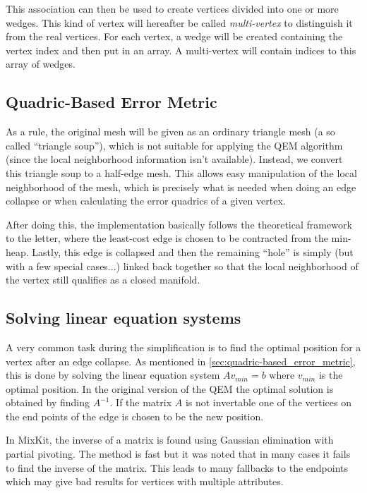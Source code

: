 This association can then be used to create vertices divided into one or more wedges. This kind of vertex will hereafter be called \emph{multi-vertex} to distinguish it from the real vertices. For each vertex, a wedge will be created containing the vertex index and then put in an array. A multi-vertex will contain indices to this array of wedges. 

\subsection{Quadric-Based Error Metric} \label{sec:quadric-based_error_metric2}
As a rule, the original mesh will be given as an ordinary triangle mesh (a so called ``triangle soup''), which is not suitable for applying the QEM algorithm (since the local neighborhood information isn't available). Instead, we convert this triangle soup to a half-edge mesh. This allows easy manipulation of the local neighborhood of the mesh, which is precisely what is needed when doing an edge collapse or when calculating the error quadrics of a given vertex.

After doing this, the implementation basically follows the theoretical framework to the letter, where the least-cost edge is chosen to be contracted from the min-heap. Lastly, this edge is collapsed and then the remaining ``hole'' is simply (but with a few special cases...) linked back together so that the local neighborhood of the vertex still qualifies as a closed manifold.

\subsection{Solving linear equation systems}
A very common task during the simplification is to find the optimal position for a vertex after an edge collapse. As mentioned in \cref{sec:quadric-based_error_metric}, this is done by solving the linear equation system \(A v_{min} = b\) where \(v_{min}\) is the optimal position. In the original version of the QEM the optimal solution is obtained by finding \(A^{-1}\). If the matrix \(A\) is not invertable one of the vertices on the end points of the edge is chosen to be the new position.

In MixKit, the inverse of a matrix is found using Gaussian elimination with partial pivoting. The method is fast but it was noted that in many cases it fails to find the inverse of the matrix. This leads to many fallbacks to the endpoints which may give bad results for vertices with multiple attributes.

